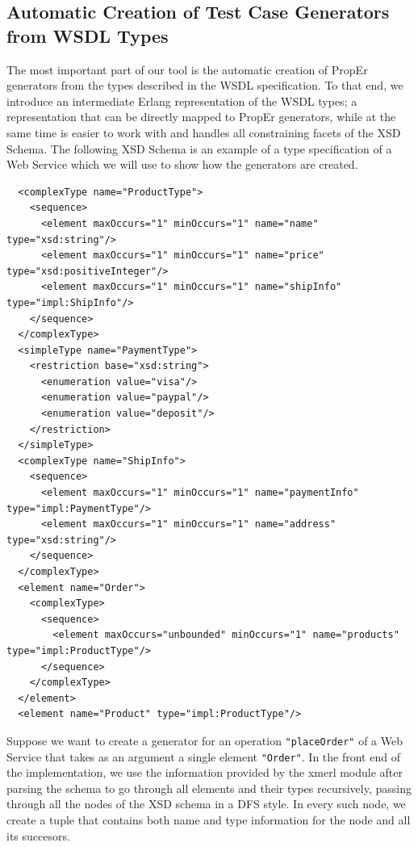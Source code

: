 \documentclass[submission,copyright,a4]{eptcs}
\begin{document}
\subsection{Automatic Creation of Test Case Generators from WSDL Types}

The most important part of our tool is the automatic creation of PropEr generators from the types described in the WSDL specification. To that end, we introduce an intermediate Erlang representation of the WSDL types; a representation that can be directly mapped to PropEr generators, while at the same time is easier to work with and handles all constraining facets of the XSD Schema. The following XSD Schema is an example of a type specification of a Web Service which we will use to show how the generators are created.

\begin{lstlisting}
  <complexType name="ProductType">
    <sequence>
      <element maxOccurs="1" minOccurs="1" name="name" type="xsd:string"/>
      <element maxOccurs="1" minOccurs="1" name="price" type="xsd:positiveInteger"/>
      <element maxOccurs="1" minOccurs="1" name="shipInfo" type="impl:ShipInfo"/>
    </sequence>
  </complexType>
  <simpleType name="PaymentType">
    <restriction base="xsd:string">
      <enumeration value="visa"/>
      <enumeration value="paypal"/>
      <enumeration value="deposit"/>
    </restriction>
  </simpleType>
  <complexType name="ShipInfo">
    <sequence>
      <element maxOccurs="1" minOccurs="1" name="paymentInfo" type="impl:PaymentType"/>
      <element maxOccurs="1" minOccurs="1" name="address" type="xsd:string"/>
    </sequence>
  </complexType>
  <element name="Order">
    <complexType>
      <sequence>
        <element maxOccurs="unbounded" minOccurs="1" name="products" type="impl:ProductType"/>
      </sequence>
    </complexType>
  </element>
  <element name="Product" type="impl:ProductType"/>
\end{lstlisting}


Suppose we want to create a generator for an operation \texttt{"placeOrder"} of a Web Service that takes as an argument a single element \texttt{"Order"}. In the front end of the implementation, we use the information provided by the xmerl module after parsing the schema to go through all elements and their types recursively, passing through all the nodes of the XSD schema in a DFS style. In every such node, we create a tuple that contains both name and type information for the node and all its succesors. 
\end{document}
